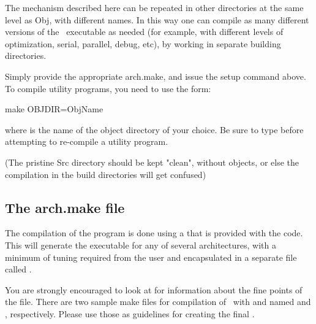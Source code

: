 The mechanism described here can be repeated in other directories at
the same level as Obj, with different names. In this way one can
compile as many different versions of the \siesta\ executable as
needed (for example, with different levels of optimization, serial,
parallel, debug, etc), by working in separate building directories.

Simply provide the appropriate arch.make, and issue the setup command
above. To compile utility programs, you need to use the form:
\begin{shellexample}
   make OBJDIR=ObjName
\end{shellexample}
where  is the name of the object directory of your
choice. Be sure to type  before attempting to
re-compile a utility program.

(The pristine Src directory should be kept "clean", without objects, or else
the compilation in the build directories will get confused)


\subsection{The arch.make file}
\label{sec:arch-make}

The compilation of the program is done using a  that is
provided with the code. This  will
generate the executable for any of several architectures, with a
minimum of tuning required from the user and encapsulated in a
separate file called .

You are strongly encouraged to look at
 for information about the
fine points of the  file. There are two sample make
files for compilation of \siesta\ with  and
 named  and
, respectively. Please use those as guidelines
for creating the final .

  



